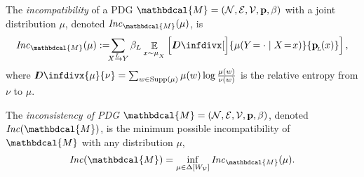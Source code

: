 \documentclass{article}
\theoremstyle{plain}
\theoremstyle{definition}
\theoremstyle{remark}
\newcommand{\thickD}{I\mkern-8muD}
\newcommand{\kldiv}{\thickD\infdivx}
\DeclareMathOperator*{\E}{\mathbb{E}} %
\newcommand\mat[1]{\mathbf{#1}}
\def\sheq{\!=\!}
\newcommand{\bp}[1][L]{\mat{p}_{\!_{#1}\!}}
\newcommand{\V}{\mathcal V}
\newcommand{\N}{\mathcal N}
\newcommand{\Ed}{\mathcal E}
\newcommand{\pdgvars}[1][]{(\N#1, \Ed#1, \V#1, \mat p#1, \beta#1)}
\newcommand{\dg}[1]{\mathbdcal{#1}}
\newcommand\Inc{\mathit{Inc}}
\newcommand{\ed}[3]{#2
  \overset{\smash{\mskip-5mu\raisebox{-1pt}{$\scriptscriptstyle
        #1$}}}{\rightarrow} #3}
\newcommand{\alle}[1][L]{_{ \ed {#1}XY}}
\numberwithin{equation}{section}
\begin{document}
\begin{defn}\label{def:inc}
	The \emph{incompatibility} of a PDG $\dg M = \pdgvars[]$ with
	a joint distribution $\mu$, denoted $\Inc_{\dg M}(\mu)$, is  
    \[
	\Inc_{\dg M }( \mu) := 
		\!\!\!\sum \alle \beta_L \E_{x \sim \mu_{_X}}
            \left[\kldiv[\Big]{ \mu(Y\!= \cdot\mid X \sheq x) }{\bp(x) } \right] ,
	\]
	where $\kldiv{\mu}{\nu} = \sum_{w \in \text{Supp($\mu$)}} \mu(w) \log\frac{\mu(w)}{\nu(w)}$ is the 
	relative entropy from $\nu$ to $\mu$.
\begin{vfull}
The \emph{inconsistency of PDG $\dg M = \pdgvars[]$}, 
       denoted $\Inc(\dg M)$, is the
minimum possible incompatibility of $\dg M$ with any
distribution $\mu$,  
	\[ \Inc(\dg M) = \inf_{ \mu \in \Delta [W_{\cal V}]} \Inc_{\dg M}(\mu) . \]
\end{vfull}
\end{defn}
\end{document}
